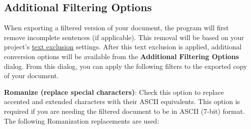 \documentclass[
]{book}
\theoremstyle{definition}
\theoremstyle{definition}
\theoremstyle{definition}
\theoremstyle{definition}
\theoremstyle{remark}
\begin{document}
\hypertarget{additional-filtering-options}{%
\subsection*{Additional Filtering Options}\label{additional-filtering-options}}

When exporting a filtered version of your document, the program will first remove incomplete sentences (if applicable). This removal will be based on your project's \protect\hyperlink{options-text-exclusion}{text exclusion} settings. After this text exclusion is applied, additional conversion options will be available from the \textbf{Additional Filtering Options} dialog. From this dialog, you can apply the following filters to the exported copy of your document.

\textbf{Romanize (replace special characters)}: Check this option to replace accented and extended characters with their ASCII equivalents. This option is required if you are needing the filtered document to be in ASCII (7-bit) format. The following Romanization replacements are used:
\end{document}
